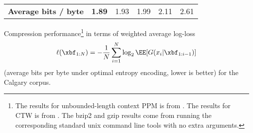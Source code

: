 \documentclass[16pt]{beamer}
\begin{document}
{\begin{block}{}
\begin{table}[t]
\begin{center}
\begin{tabular}{l||r|c|c|c|c}
\textbf{Average bits / byte}      &{\bf 1.89}   & 1.93  &  1.99 & 2.11 & 2.61 \\%
\end{tabular}
\end{center}
\label{table:results}
\end{table}
\end{block}
Compression performance\footnote{The results for unbounded-length context PPM is from 
\cite{Cleary1997b}. The results for CTW is from \cite{Willems2009}.   The
bzip2 and gzip results come from running the corresponding standard unix
command line tools with no extra arguments.} in terms of weighted average log-loss
\[\ell(\xbf_{1:N}) = -\frac{1}{N}\sum_{i=1}^N \log_2 \EE[G(x_i|\xbf_{1:i-1})]\]
(average bits per byte under optimal entropy encoding, lower is better) for
the Calgary corpus.


}
\end{document}
